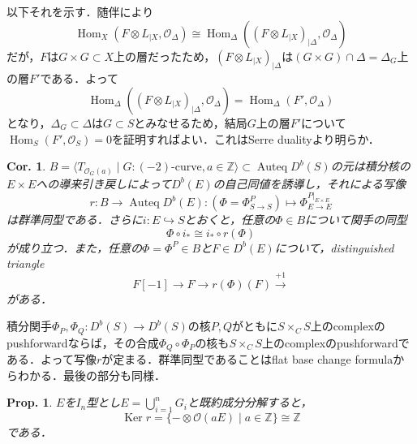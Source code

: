 \documentclass[uplatex,a4paper,11pt,dvipdfmx]{jsarticle}
\makeatletter
\theoremstyle{mystyle} %
\newtheorem{proposition}[theorem]{Prop.}
\newtheorem{corollary}[theorem]{Cor.}
\renewenvironment{proof}[1][\proofname]{\par
 \pushQED{\qed}%
 \normalfont \topsep6\p@\@plus6\p@\relax
 \trivlist
 \item[\hskip\labelsep
 \itshape
 {\bf\underline{#1}}]\ignorespaces
}{%
 \popQED\endtrivlist\@endpefalse
}
\DeclareMathOperator{\Auteq}{Auteq}\DeclareMathOperator{\Coh}{Coh}
\DeclareMathOperator{\Hom}{Hom}
\DeclareMathOperator{\Ker}{Ker}
\makeatother
\begin{document}
\begin{proof}
	以下それを示す．随伴により$$\Hom_X(F\otimes L_{|X}, \mathcal{O}_\Delta)\cong\Hom_\Delta((F\otimes L_{|X})_{|\Delta}, \mathcal{O}_\Delta)$$だが，$F$は$G \times G \subset X$上の層だったため，$(F\otimes L_{|X})_{|\Delta}$は$(G \times G) \cap \Delta = \Delta_G$上の層$F'$である．よって$$\Hom_\Delta((F\otimes L_{|X})_{|\Delta}, \mathcal{O}_\Delta)=\Hom_\Delta(F', \mathcal{O}_\Delta)$$となり，$\Delta_G \subset \Delta$は$G \subset S$とみなせるため，結局$G$上の層$F'$について$\Hom_S(F', \mathcal{O}_S)=0$を証明すればよい．これはSerre dualityより明らか．
\end{proof}

\begin{corollary}\label{restriction_map}
	$B = \langle T_{\mathcal{O}_G(a)} \mid G \colon \text{$(-2)$-curve}, a \in \mathbb{Z} \rangle \subset \Auteq D^b(S)$の元は積分核の$E\times E$への導来引き戻しによって$D^b(E)$の自己同値を誘導し，それによる写像$$r \colon B \to \Auteq D^b(E) \colon (\Phi = \Phi^P_{S \to S}) \mapsto \Phi^{P|_{E \times E}}_{E \to E}$$は群準同型である．さらに$i \colon E \hookrightarrow S$とおくと，任意の$\Phi \in B$について関手の同型$$\Phi \circ i_* \cong i_* \circ r(\Phi)$$が成り立つ．また，任意の$\Phi=\Phi^P \in B$と$F \in D^b(E)$について，distinguished triangle$$F[-1] \to F\to r(\Phi)(F) \xrightarrow{+1} $$がある．
\end{corollary}
\begin{proof}
	積分関手$\Phi_P, \Phi_Q \colon D^b(S) \to D^b(S)$の核$P, Q$がともに$S \times_C S$上のcomplexのpushforwardならば，その合成$\Phi_Q \circ \Phi_P$の核も$S \times_C S$上のcomplexのpushforwardである．よって写像$r$が定まる．群準同型であることはflat base change formulaからわかる．最後の部分も同様．
\end{proof}
\begin{proposition}
	$E$を$I_n$型とし$E = \bigcup_{i=1}^n G_i$と既約成分分解すると，$$\Ker r = \{-\otimes \mathcal{O}(aE) \mid a \in \mathbb{Z}\} \cong \mathbb{Z}$$である．
\end{proposition}
\end{document}
